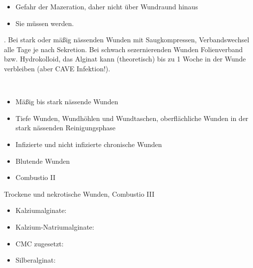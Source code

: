 {\begin{description}
\begin{itemize}
    sonst Gefahr des Austrocknens
    \item[$~$] Gefahr der Mazeration, daher nicht über
    Wundraund hinaus
    \item[$-$] Sie müssen  werden.
  \end{itemize}
  \item[Anwendung] . Bei stark oder
  mäßig nässenden Wunden mit Saugkompressen, Verbandswechsel alle
   Tage je nach Sekretion. Bei schwach
  sezernierenden Wunden Folienverband bzw. Hydrokolloid, das
  Alginat kann (theoretisch) bis zu 1 Woche in der Wunde
  verbleiben (aber CAVE Infektion!).
  \item[Indikationen] ~
\begin{itemize}
    \item Mäßig bis stark nässende Wunden
    \item Tiefe Wunden, Wundhöhlen und
    Wundtaschen, oberflächliche Wunden in der stark
    nässenden Reinigungsphase
    \item Infizierte und nicht infizierte chronische Wunden
    \item Blutende Wunden
    \item Combustio II\textdegree
  \end{itemize}
  \item[Kontraindikationen] Trockene und nekrotische Wunden,
  Combustio III\textdegree
\end{description}
}
{
\begin{itemize}
    \item Kalziumalginate: 
    \item Kalzium-Natriumalginate: 
    \item CMC zugesetzt: 
    \item Silberalginat: 
  \end{itemize}
}
{}
{}
{}

